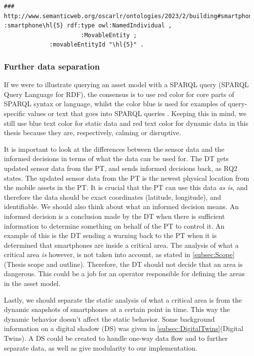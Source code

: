 \documentclass{article}
\begin{document}
\begin{Verbatim}[commandchars=\\\{\}, breakanywhere=true]
### http://www.semanticweb.org/oscarlr/ontologies/2023/2/building#smartphone\hl{5}
:smartphone\hl{5} rdf:type owl:NamedIndividual ,
                      :MovableEntity ;
             :movableEntityId "\hl{5}" .
\end{Verbatim}

\subsubsection{Further data separation}\label{subsubsec:FurtherDataSeparation}
If we were to illustrate querying an asset model with a SPARQL query (SPARQL Query Language for RDF), the consensus is to use red color for core parts of SPARQL syntax or language, whilst the color blue is used for examples of query-specific values or text that goes into SPARQL queries \cite{noauthor_sparql_nodate}. Keeping this in mind, we still use blue text color for static data and red text color for dynamic data in this thesis because they are, respectively, calming or disruptive. 

It is important to look at the differences between the sensor data and the informed decisions in terms of what the data can be used for. The DT gets updated sensor data from the PT, and sends informed decisions back, as RQ2 states. The updated sensor data from the PT is the newest physical location from the mobile assets in the PT. It is crucial that the PT can use this data \emph{as is}, and therefore the data should be exact coordinates (latitude, longitude), and identifiable. We should also think about what an informed decision means. An informed decision is a conclusion made by the DT when there is sufficient information to determine something on behalf of the PT to control it. An example of this is the DT sending a warning back to the PT when it is determined that smartphones are inside a critical area. The analysis of what a critical area \emph{is} however, is not taken into account, as stated in \ref{subsec:Scope}(Thesis scope and outline). Therefore, the DT should not decide that an area is dangerous. This could be a job for an operator responsible for defining the areas in the asset model.

Lastly, we should separate the static analysis of what a critical area is from the dynamic snapshots of smartphones at a certain point in time. This way the dynamic behavior doesn't affect the static behavior. Some background information on a digital shadow (DS) was given in \ref{subsec:DigitalTwins}(Digital Twins). A DS could be created to handle one-way data flow and to further separate data, as well as give modularity to our implementation.
\end{document}
